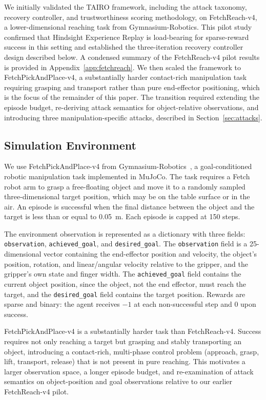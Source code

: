 \documentclass[conference]{IEEEtran}
\begin{document}
We initially validated the TAIRO framework, including the attack taxonomy, recovery
controller, and trustworthiness scoring methodology, on FetchReach-v4, a
lower-dimensional reaching task from Gymnasium-Robotics. This pilot study confirmed
that Hindsight Experience Replay is load-bearing for sparse-reward success in this
setting and established the three-iteration recovery controller design described
below. A condensed summary of the FetchReach-v4 pilot results is provided in
Appendix~\ref{app:fetchreach}. We then scaled the framework to FetchPickAndPlace-v4, a
substantially harder contact-rich manipulation task requiring grasping and transport
rather than pure end-effector positioning, which is the focus of the remainder of this
paper. The transition required extending the episode budget, re-deriving attack
semantics for object-relative observations, and introducing three manipulation-specific
attacks, described in Section~\ref{sec:attacks}.

\subsection{Simulation Environment}

We use FetchPickAndPlace-v4 from Gymnasium-Robotics~\cite{gymnasiumrobotics2024}, a
goal-conditioned robotic manipulation task implemented in MuJoCo. The task requires a
Fetch robot arm to grasp a free-floating object and move it to a randomly sampled
three-dimensional target position, which may be on the table surface or in the air. An
episode is successful when the final distance between the object and the target is less
than or equal to 0.05~m. Each episode is capped at 150 steps.

The environment observation is represented as a dictionary with three fields:
\texttt{observation}, \texttt{achieved\_goal}, and \texttt{desired\_goal}. The
\texttt{observation} field is a 25-dimensional vector containing the end-effector
position and velocity, the object's position, rotation, and linear/angular velocity
relative to the gripper, and the gripper's own state and finger width. The
\texttt{achieved\_goal} field contains the current object position, since the object,
not the end effector, must reach the target, and the \texttt{desired\_goal} field
contains the target position. Rewards are sparse and binary: the agent receives $-1$ at
each non-successful step and $0$ upon success.

FetchPickAndPlace-v4 is a substantially harder task than FetchReach-v4. Success
requires not only reaching a target but grasping and stably transporting an object,
introducing a contact-rich, multi-phase control problem (approach, grasp, lift,
transport, release) that is not present in pure reaching. This motivates a larger
observation space, a longer episode budget, and re-examination of attack semantics on
object-position and goal observations relative to our earlier FetchReach-v4 pilot.
\end{document}
